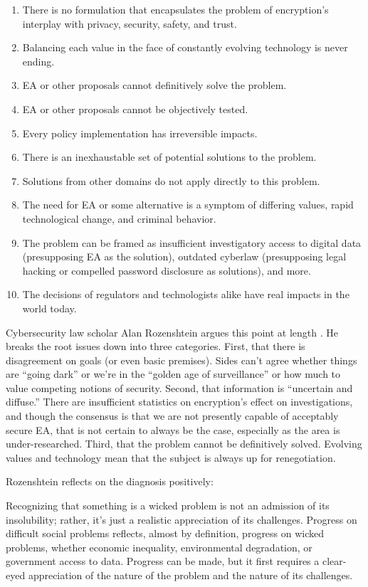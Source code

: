 \begin{enumerate}
  \item There is no formulation that encapsulates the problem of encryption's interplay with privacy, security,
        safety, and trust.
  \item Balancing each value in the face of constantly evolving technology is never ending.
  \item \ac{EA} or other proposals cannot definitively solve the problem.
  \item \ac{EA} or other proposals cannot be objectively tested.
  \item Every policy implementation has irreversible impacts.
  \item There is an inexhaustable set of potential solutions to the problem.
  \item Solutions from other domains do not apply directly to this problem.
  \item The need for \ac{EA} or some alternative is a symptom of differing values, rapid technological change, and
        criminal behavior.
  \item The problem can be framed as insufficient investigatory access to digital data (presupposing \ac{EA} as the
        solution), outdated cyberlaw (presupposing legal hacking or compelled password disclosure as solutions), and
        more.
  \item The decisions of regulators and technologists alike have real impacts in the world today.
\end{enumerate}

Cybersecurity law scholar Alan Rozenshtein argues this point at length \cite{rozenshtein_wicked_2018}. He breaks the
root issues down into three categories. First, that there is disagreement on goals (or even basic premises). Sides can't
agree whether things are ``going dark'' or we're in the ``golden age of surveillance'' or how much to value competing
notions of security. Second, that information is ``uncertain and diffuse.'' There are insufficient statistics on
encryption's effect on investigations, and though the consensus is that we are not presently capable of acceptably
secure \ac{EA}, that is not certain to always be the case, especially as the area is under-researched. Third, that the
problem cannot be definitively solved. Evolving values and technology mean that the subject is always up for
renegotiation.

Rozenshtein reflects on the diagnosis positively:

\begin{displayquote}
Recognizing that something is a wicked problem is not an admission of its insolubility; rather, it’s just a realistic
appreciation of its challenges. Progress on difficult social problems reflects, almost by definition, progress on wicked
problems, whether economic inequality, environmental degradation, or government access to data. Progress can be made,
but it first requires a clear-eyed appreciation of the nature of the problem and the nature of its challenges.
\cite{rozenshtein_wicked_2018}
\end{displayquote}

